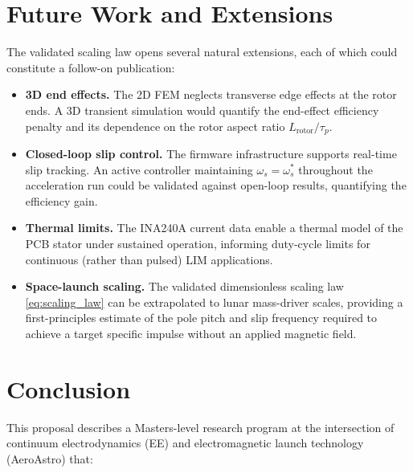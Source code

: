\documentclass[12pt,letterpaper]{article}
\begin{document}
\section{Future Work and Extensions}

The validated scaling law opens several natural extensions, each of which could
constitute a follow-on publication:

\begin{itemize}[noitemsep]
  \item \textbf{3D end effects.} The 2D FEM neglects transverse edge effects at the
    rotor ends. A 3D transient simulation would quantify the end-effect efficiency
    penalty and its dependence on the rotor aspect ratio $L_{\mathrm{rotor}}/\tau_p$.
  \item \textbf{Closed-loop slip control.} The firmware infrastructure supports
    real-time slip tracking. An active controller maintaining $\omega_s = \omega_s^*$
    throughout the acceleration run could be validated against open-loop results,
    quantifying the efficiency gain.
  \item \textbf{Thermal limits.} The INA240A current data enable a thermal model of
    the PCB stator under sustained operation, informing duty-cycle limits for continuous
    (rather than pulsed) LIM applications.
  \item \textbf{Space-launch scaling.} The validated dimensionless scaling law
    \cref{eq:scaling_law} can be extrapolated to lunar mass-driver scales, providing
    a first-principles estimate of the pole pitch and slip frequency required to achieve
    a target specific impulse without an applied magnetic field.
\end{itemize}

\section{Conclusion}

This proposal describes a Masters-level research program at the intersection of
continuum electrodynamics (EE) and electromagnetic launch technology (AeroAstro) that:
\end{document}
